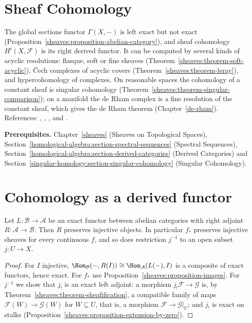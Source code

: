 \section{Sheaf Cohomology}\label{sheaves:section-sheaf-cohomology}
The global sections functor $\Gamma(X, -)$ is left exact but not exact (Proposition~\ref{sheaves:proposition-abelian-category}), and
sheaf cohomology $H^i(X, \mathcal{F})$ is its right derived functor. It can be computed by several kinds of acyclic resolutions:
flasque, soft or fine sheaves (Theorem~\ref{sheaves:theorem-soft-acyclic}), \v{C}ech complexes of acyclic covers
(Theorem~\ref{sheaves:theorem-leray}), and hypercohomology of complexes. On reasonable spaces the cohomology of a constant
sheaf is singular cohomology (Theorem~\ref{sheaves:theorem-singular-comparison}); on a manifold the de Rham complex is a fine
resolution of the constant sheaf, which gives the de Rham theorem (Chapter~\ref{de-rham}). References: \cite[Chapter III]{hartshorne-ag},
\cite{godement-faisceaux}, \cite{bredon-sheaf}, \cite{ks-sheaves-manifolds} and \cite[Chapter 4]{voisin-hodge-1}.

\noindent\textbf{Prerequisites.} Chapter~\ref{sheaves} (Sheaves on Topological Spaces), Section~\ref{homological-algebra:section-spectral-sequences} (Spectral Sequences),
Section~\ref{homological-algebra:section-derived-categories} (Derived Categories) and Section~\ref{singular-homology:section-singular-cohomology} (Singular Cohomology).

\section{Cohomology as a derived functor}\label{sheaves:section-derived}

\begin{lemma}\label{sheaves:lemma-adjoints-injectives}
Let $L \colon \mathcal{B} \to \mathcal{A}$ be an exact functor between abelian categories with right adjoint $R \colon \mathcal{A} \to \mathcal{B}$. Then $R$ preserves injective objects.
In particular $f_*$ preserves injective sheaves for every continuous $f$, and so does restriction $j^{-1}$ to an open subset $j \colon U \to X$.
\end{lemma}

\begin{proof}
For $I$ injective, $\Hom_\mathcal{B}(-, R(I)) \cong \Hom_\mathcal{A}(L(-), I)$ is a composite of exact functors, hence exact. For $f_*$ use
Proposition~\ref{sheaves:proposition-images}. For $j^{-1}$ we show that $j_!$ is an exact left adjoint: a morphism $j_!\mathcal{F} \to \mathcal{G}$ is, by
Theorem~\ref{sheaves:theorem-sheafification}, a compatible family of maps $\mathcal{F}(W) \to \mathcal{G}(W)$ for $W \subseteq U$, that is, a morphism
$\mathcal{F} \to \mathcal{G}|_U$; and $j_!$ is exact on stalks (Proposition~\ref{sheaves:proposition-extension-by-zero}).
\end{proof}

